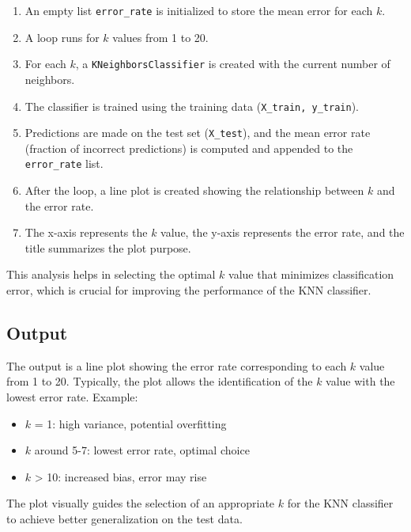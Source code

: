 \documentclass[11pt,a4paper]{report}
\begin{document}
\begin{enumerate}
    \item An empty list \texttt{error\_rate} is initialized to store the mean error for each $k$.
    \item A loop runs for $k$ values from 1 to 20.
    \item For each $k$, a \texttt{KNeighborsClassifier} is created with the current number of neighbors.
    \item The classifier is trained using the training data (\texttt{X\_train, y\_train}).
    \item Predictions are made on the test set (\texttt{X\_test}), and the mean error rate (fraction of incorrect predictions) is computed and appended to the \texttt{error\_rate} list.
    \item After the loop, a line plot is created showing the relationship between $k$ and the error rate.
    \item The x-axis represents the $k$ value, the y-axis represents the error rate, and the title summarizes the plot purpose.
\end{enumerate}

This analysis helps in selecting the optimal $k$ value that minimizes classification error, which is crucial for improving the performance of the KNN classifier.

\subsection*{Output}
The output is a line plot showing the error rate corresponding to each $k$ value from 1 to 20. Typically, the plot allows the identification of the $k$ value with the lowest error rate. Example:

\begin{itemize}
    \item $k$ = 1: high variance, potential overfitting
    \item $k$ around 5-7: lowest error rate, optimal choice
    \item $k$ > 10: increased bias, error may rise
\end{itemize}

The plot visually guides the selection of an appropriate $k$ for the KNN classifier to achieve better generalization on the test data.

    \begin{center}
    \end{center}
    { \hspace*{\fill} \\}
    \newpage
    
\end{document}
